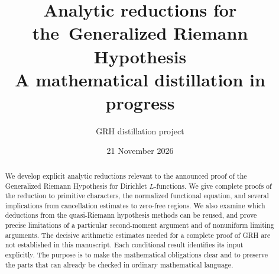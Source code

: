 \documentclass[11pt,a4paper]{article}
\title{Analytic reductions for the\ Generalized Riemann Hypothesis\\[0.4em]
  \large A mathematical distillation in progress}
\author{GRH distillation project}
\date{21 November 2026}
\theoremstyle{definition}
\theoremstyle{remark}
\numberwithin{equation}{section}
\begin{document}
\maketitle
\begin{abstract}
We develop explicit analytic reductions relevant to the announced proof of
the Generalized Riemann Hypothesis for Dirichlet $L$-functions. We give
complete proofs of the reduction to primitive characters, the normalized
functional equation, and several implications from cancellation estimates
to zero-free regions. We also examine which deductions from the quasi-Riemann
hypothesis methods can be reused, and prove precise limitations of a
particular second-moment argument and of nonuniform limiting arguments.
The decisive arithmetic estimates needed for a complete proof of GRH are
not established in this manuscript. Each conditional result identifies its
input explicitly. The purpose is to make the mathematical obligations
clear and to preserve the parts that can already be checked in ordinary
mathematical language.
\end{abstract}
\tableofcontents
\clearpage







\clearpage

\end{document}
